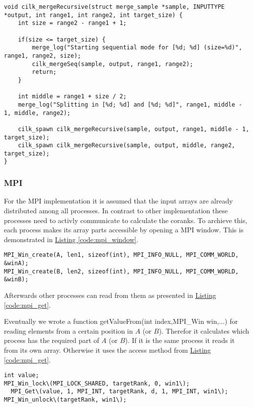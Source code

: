 \begin{lstlisting}[caption=recursive cilk strategy, label=code:cilk_recursion, style=c]
void cilk_mergeRecursive(struct merge_sample *sample, INPUTTYPE *output, int range1, int range2, int target_size) {
	int size = range2 - range1 + 1;
	
	if(size <= target_size) {
		merge_log("Starting sequential mode for [%d; %d] (size=%d)", range1, range2, size);
		cilk_mergeSeq(sample, output, range1, range2);
		return;
	}
	
	int middle = range1 + size / 2;
	merge_log("Splitting in [%d; %d] and [%d; %d]", range1, middle - 1, middle, range2);
	
	cilk_spawn cilk_mergeRecursive(sample, output, range1, middle - 1, target_size);
	cilk_spawn cilk_mergeRecursive(sample, output, middle, range2, target_size);
}
\end{lstlisting}

\subsubsection{MPI}
For the MPI implementation it is assumed that the input arrays are already distributed among all processes.
In contrast to other implementation these processes need to activly communicate to calculate the coranks.
To archieve this, each process makes its array parts accessible by opening a MPI window.
This is demonstrated in \hyperref[code:mpi_window]{Listing \ref*{code:mpi_window}}.

\begin{lstlisting}[caption=window to share arrays, label=code:mpi_window,style=c]
MPI_Win_create(A, len1, sizeof(int), MPI_INFO_NULL, MPI_COMM_WORLD, &winA);
MPI_Win_create(B, len2, sizeof(int), MPI_INFO_NULL, MPI_COMM_WORLD, &winB);
\end{lstlisting}

Afterwards other processes can read from them as presented in \hyperref[code:mpi_get]{Listing \ref*{code:mpi_get}}.

Eventually we wrote a function getValueFrom(int index,MPI\_Win win,...) for reading elements from a certain position in $A$ (or $B$).
Therefor it calculates which process has the required part of $A$ (or $B$).
If it is the same process it reads it from its own array.
Otherwise it uses the access method from \hyperref[code:mpi_get]{Listing \ref*{code:mpi_get}}.

\begin{lstlisting}[caption=window to share arrays, label=code:mpi_get, style=c]
int value;
MPI_Win_lock\(MPI_LOCK_SHARED, targetRank, 0, win1\);
  MPI_Get\(value, 1, MPI_INT, targetRank, d, 1, MPI_INT, win1\);
MPI_Win_unlock\(targetRank, win1\);
\end{lstlisting}

